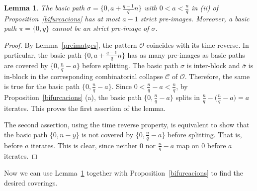\documentclass[a4paper]{amsart}
\newtheorem{lemma}[theorem]{Lemma}
\theoremstyle{definition}
\begin{document}
\begin{lemma}\label{pre-maximal}
The basic path $\sigma=\{0,a+\frac{q-1}{q}n\}$ with $0<a<\frac{n}{q}$ in (ii) of Proposition~\ref{bifurcacions} has at most $a-1$ strict pre-images. Moreover, a basic path
$\pi=\{0,y\}$ cannot be an strict pre-image of $\sigma$.
\end{lemma}
\begin{proof}
By Lemma~\ref{preimatges}, the pattern $\mathcal{O}$ coincides with its time reverse. In particular, the basic path $\{0,a+\frac{q-1}{q}n\}$ has as many pre-images as basic paths are covered by $\{0,\frac{n}{q}-a\}$ before splitting. The basic path $\sigma$ is inter-block and $\overline{\sigma}$ is in-block in the corresponding combinatorial collapse $\mathcal{C}$ of $\mathcal{O}$. Therefore, the same is true for the basic path $\{0,\frac{n}{q}-a\}$. Since $0<\frac{n}{q}-a<\frac{n}{q}$, by Proposition~\ref{bifurcacions} (a), the basic path $\{0,\frac{n}{q}-a\}$
splits in $\frac{n}{q}-\bigl(\frac{n}{q}-a\bigr)=a$ iterates. This proves the first assertion of the lemma.

The second assertion, using the time reverse property, is equivalent to show that the basic path $\{0,n-y\}$ is not covered by $\{0,\frac{n}{q}-a\}$ before splitting. That is, before $a$ iterates. This is clear, since neither $0$ nor $\frac{n}{q}-a$ map on $0$ before $a$ iterates.
\end{proof}

Now we can use Lemma~\ref{pre-maximal} together with Proposition~\ref{bifurcacions} to find the desired coverings.
\end{document}
